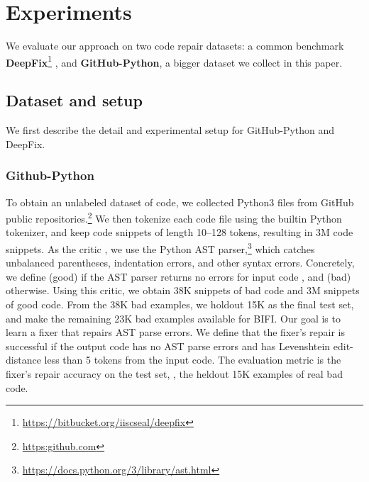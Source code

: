 \section{Experiments}
\label{sec:experiments}

We evaluate our approach on two code repair datasets: a common benchmark \textbf{DeepFix}\footnote{{\url{https://bitbucket.org/iiscseal/deepfix}}} \citep{gupta2017deepfix}, and \textbf{GitHub-Python}, a bigger dataset we collect in this paper.


\subsection{Dataset and setup}
\label{sec:exp-setup}

We first describe the detail and experimental setup for GitHub-Python and DeepFix.

\subsubsection{Github-Python}
To obtain an unlabeled dataset of code, we collected Python3 files from GitHub public repositories.\footnote{\url{https:github.com}\vspace{0mm}}
We then tokenize each code file using the builtin Python tokenizer, and keep code snippets of length 10--128 tokens, resulting in 3M code snippets.
As the critic , we use the Python AST parser,\footnote{\url{https://docs.python.org/3/library/ast.html}} 
which catches unbalanced parentheses, indentation errors, and other syntax errors. Concretely, we define  (good) if the AST parser returns no errors for input code , and  (bad) otherwise.
Using this critic, we obtain 38K snippets of bad code and 3M snippets of good code.
From the 38K bad examples, we holdout 15K as the final test set, and make the remaining 23K bad examples available for BIFI.
Our goal is to learn a fixer that repairs AST parse errors. We define that the fixer's repair is successful if the output code has no AST parse errors and has Levenshtein edit-distance \cite{levenshtein1966binary} less than 5 tokens from the input code.
The evaluation metric is the fixer's repair accuracy on the test set, \ie, the heldout 15K examples of real bad code.

